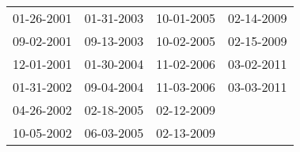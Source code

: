 \begin{supertabular}{llll}
 01-26-2001 &  01-31-2003 &  10-01-2005 &  02-14-2009 \\
 09-02-2001 &  09-13-2003 &  10-02-2005 &  02-15-2009 \\
 12-01-2001 &  01-30-2004 &  11-02-2006 &  03-02-2011 \\
 01-31-2002 &  09-04-2004 &  11-03-2006 &  03-03-2011 \\
 04-26-2002 &  02-18-2005 &  02-12-2009 &             \\
 10-05-2002 &  06-03-2005 &  02-13-2009 &             \\
\end{supertabular}
